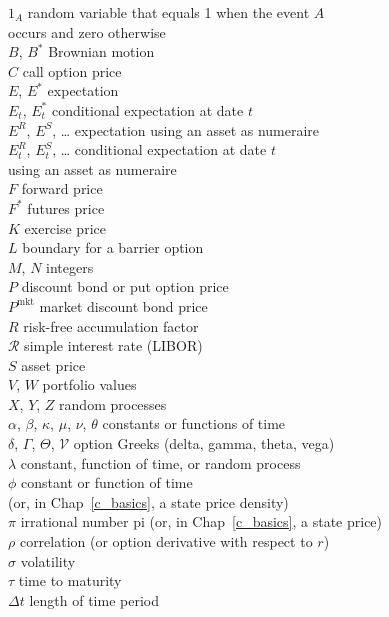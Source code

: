 \begin{tabbing}
$1_A$ \> random variable that equals 1 when the event $A$ \\
\> \qquad occurs and zero otherwise\\
$B$, $B^*$ \> Brownian motion\\
$C$ \> call option price\\
$E$, $E^*$ \> expectation\\
$E_t$, $E^*_t$ \> conditional expectation at date $t$\\
$E^R$, $E^S$, \ldots \> expectation using an asset as numeraire\\
$E^R_t$, $E^S_t$, \ldots \> conditional expectation at date $t$ \\
\> \qquad using an asset as numeraire\\
$F$ \> forward price\\
$F^*$ \> futures price\\
$K$ \> exercise price\\
$L$ \> boundary for a barrier option\\
$M$, $N$ \> integers\\
$P$ \> discount bond or put option price\\
$P^{\text{mkt}}$ \> market discount bond price\\
$R$ \> risk-free accumulation factor\\
$\mathcal{R}$ \> simple interest rate (LIBOR)\\
$S$ \> asset price\\
$V$, $W$ \> portfolio values\\
$X$, $Y$, $Z$ \> random processes \\
$\alpha$, $\beta$, $\kappa$,  $\mu$,  $\nu$, $\theta$ \> constants or functions of time\\
$\delta$, $\Gamma$, $\Theta$, $\mathcal{V}$  \> option Greeks (delta, gamma, theta, vega)\\
$\lambda$ \> constant, function of time, or random process\\
$\phi$ \> constant or function of time \\
\> \qquad (or, in Chap~\ref{c_basics}, a state price density)\\
$\pi$ \> irrational number pi (or, in Chap~\ref{c_basics}, a state price)\\
$\rho$ \> correlation (or option derivative with respect to $r$)\\
$\sigma$ \> volatility\\
$\tau$ \> time to maturity\\
$\varDelta t$ \> length of time period\\

\end{tabbing}

